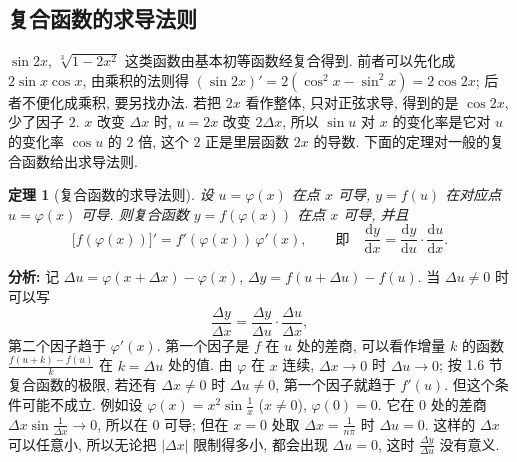 \documentclass[UTF8,openany]{ctexbook}
\theoremstyle{chinesetextbook}
\newtheorem{theorem}{定理}[section]
\newcommand{\dd}{\mathrm d}
\begin{document}
\subsection{复合函数的求导法则}
$\sin2x$, $\sqrt[3]{1-2x^2}$ 这类函数由基本初等函数经复合得到. 前者可以先化成 $2\sin x\cos x$, 由乘积的法则得 $(\sin2x)'=2(\cos^2x-\sin^2x)=2\cos2x$; 后者不便化成乘积, 要另找办法. 若把 $2x$ 看作整体, 只对正弦求导, 得到的是 $\cos2x$, 少了因子 $2$. $x$ 改变 $\Delta x$ 时, $u=2x$ 改变 $2\Delta x$, 所以 $\sin u$ 对 $x$ 的变化率是它对 $u$ 的变化率 $\cos u$ 的 $2$ 倍, 这个 $2$ 正是里层函数 $2x$ 的导数. 下面的定理对一般的复合函数给出求导法则.
\begin{theorem}[复合函数的求导法则]\label{thm:c2-2-chain}
设 $u=\varphi(x)$ 在点 $x$ 可导, $y=f(u)$ 在对应点 $u=\varphi(x)$ 可导. 则复合函数 $y=f(\varphi(x))$ 在点 $x$ 可导, 并且
\[
\bigl[f(\varphi(x))\bigr]'=f'(\varphi(x))\,\varphi'(x),\qquad\text{即}\quad\frac{\dd y}{\dd x}=\frac{\dd y}{\dd u}\cdot\frac{\dd u}{\dd x}.
\]
\end{theorem}
\par\indent\textbf{分析:} 记 $\Delta u=\varphi(x+\Delta x)-\varphi(x)$, $\Delta y=f(u+\Delta u)-f(u)$. 当 $\Delta u\ne0$ 时可以写
\[
\frac{\Delta y}{\Delta x}=\frac{\Delta y}{\Delta u}\cdot\frac{\Delta u}{\Delta x},
\]
第二个因子趋于 $\varphi'(x)$. 第一个因子是 $f$ 在 $u$ 处的差商, 可以看作增量 $k$ 的函数 $\displaystyle\frac{f(u+k)-f(u)}k$ 在 $k=\Delta u$ 处的值. 由 $\varphi$ 在 $x$ 连续, $\Delta x\to0$ 时 $\Delta u\to0$; 按 1.6 节复合函数的极限, 若还有 $\Delta x\ne0$ 时 $\Delta u\ne0$, 第一个因子就趋于 $f'(u)$. 但这个条件可能不成立. 例如设 $\displaystyle\varphi(x)=x^2\sin\frac1x$ ($x\ne0$), $\varphi(0)=0$. 它在 $0$ 处的差商 $\displaystyle\Delta x\sin\frac1{\Delta x}\to0$, 所以在 $0$ 可导; 但在 $x=0$ 处取 $\displaystyle\Delta x=\frac1{n\pi}$ 时 $\Delta u=0$. 这样的 $\Delta x$ 可以任意小, 所以无论把 $|\Delta x|$ 限制得多小, 都会出现 $\Delta u=0$, 这时 $\displaystyle\frac{\Delta y}{\Delta u}$ 没有意义.
\end{document}
